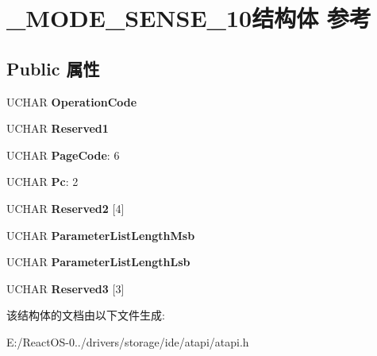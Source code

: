 \hypertarget{struct___m_o_d_e___s_e_n_s_e__10}{}\section{\+\_\+\+M\+O\+D\+E\+\_\+\+S\+E\+N\+S\+E\+\_\+10结构体 参考}
\label{struct___m_o_d_e___s_e_n_s_e__10}
\subsection*{Public 属性}
\begin{DoxyCompactItemize}
\item 
\mbox{\label{struct___m_o_d_e___s_e_n_s_e__10_ac7c0d6612eccc96bdba960bce7855406}} 
U\+C\+H\+AR {\bfseries Operation\+Code}
\item 
\mbox{\label{struct___m_o_d_e___s_e_n_s_e__10_a53805d12d7477b17d6d0c86949f65032}} 
U\+C\+H\+AR {\bfseries Reserved1}
\item 
\mbox{\label{struct___m_o_d_e___s_e_n_s_e__10_a30a5ea72d40b1a567871d94d62a7f639}} 
U\+C\+H\+AR {\bfseries Page\+Code}\+: 6
\item 
\mbox{\label{struct___m_o_d_e___s_e_n_s_e__10_a1b76ce9a9058cfa363efb286cfa3cc5a}} 
U\+C\+H\+AR {\bfseries Pc}\+: 2
\item 
\mbox{\label{struct___m_o_d_e___s_e_n_s_e__10_a3107acf193ed35b33ca19c817c5a02b1}} 
U\+C\+H\+AR {\bfseries Reserved2} \mbox{[}4\mbox{]}
\item 
\mbox{\label{struct___m_o_d_e___s_e_n_s_e__10_ad6844d0c191160325d3ef3040f18e441}} 
U\+C\+H\+AR {\bfseries Parameter\+List\+Length\+Msb}
\item 
\mbox{\label{struct___m_o_d_e___s_e_n_s_e__10_aeabfe1fdcd53dde724bf7eca63945a90}} 
U\+C\+H\+AR {\bfseries Parameter\+List\+Length\+Lsb}
\item 
\mbox{\label{struct___m_o_d_e___s_e_n_s_e__10_a645a865e8d1ae96f9d6b4cc461431734}} 
U\+C\+H\+AR {\bfseries Reserved3} \mbox{[}3\mbox{]}
\end{DoxyCompactItemize}


该结构体的文档由以下文件生成\+:\begin{DoxyCompactItemize}
\item 
E\+:/\+React\+O\+S-\/0../drivers/storage/ide/atapi/atapi.\+h\end{DoxyCompactItemize}
